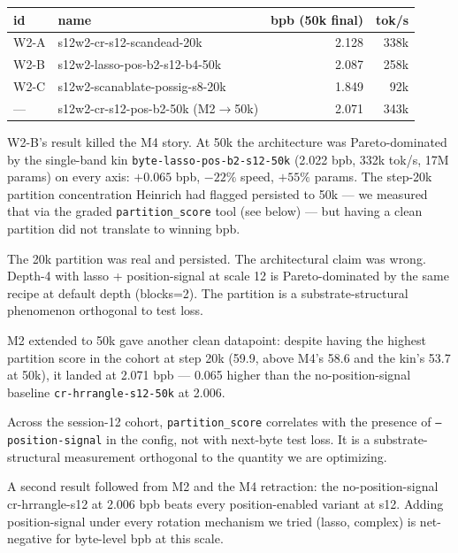 \begin{center}
\begin{tabular}{llrr}
\toprule
id & name & bpb (50k final) & tok/s \\
\midrule
W2-A & s12w2-cr-s12-scandead-20k & 2.128 & 338k \\
W2-B & s12w2-lasso-pos-b2-s12-b4-50k & 2.087 & 258k \\
W2-C & s12w2-scanablate-possig-s8-20k & 1.849 & 92k \\
--- & s12w2-cr-s12-pos-b2-50k (M2$\to$50k) & 2.071 & 343k \\
\bottomrule
\end{tabular}
\end{center}

W2-B's result killed the M4 story. At 50k the architecture was Pareto-dominated by the single-band kin \texttt{byte-lasso-pos-b2-s12-50k} (2.022 bpb, 332k tok/s, 17M params) on every axis: $+0.065$ bpb, $-22\%$ speed, $+55\%$ params. The step-20k partition concentration Heinrich had flagged persisted to 50k --- we measured that via the graded \texttt{partition\_score} tool (see below) --- but having a clean partition did not translate to winning bpb.

\begin{retraction}
The 20k partition was real and persisted. The architectural claim was wrong. Depth-4 with lasso + position-signal at scale 12 is Pareto-dominated by the same recipe at default depth (blocks=2). The partition is a substrate-structural phenomenon orthogonal to test loss.
\end{retraction}

M2 extended to 50k gave another clean datapoint: despite having the highest partition score in the cohort at step 20k (59.9, above M4's 58.6 and the kin's 53.7 at 50k), it landed at 2.071 bpb --- 0.065 higher than the no-position-signal baseline \texttt{cr-hrrangle-s12-50k} at 2.006.

\begin{result}
Across the session-12 cohort, \texttt{partition\_score} correlates with the presence of \texttt{--position-signal} in the config, not with next-byte test loss. It is a substrate-structural measurement orthogonal to the quantity we are optimizing.
\end{result}

A second result followed from M2 and the M4 retraction: the no-position-signal cr-hrrangle-s12 at 2.006 bpb beats every position-enabled variant at s12. Adding position-signal under every rotation mechanism we tried (lasso, complex) is net-negative for byte-level bpb at this scale.

